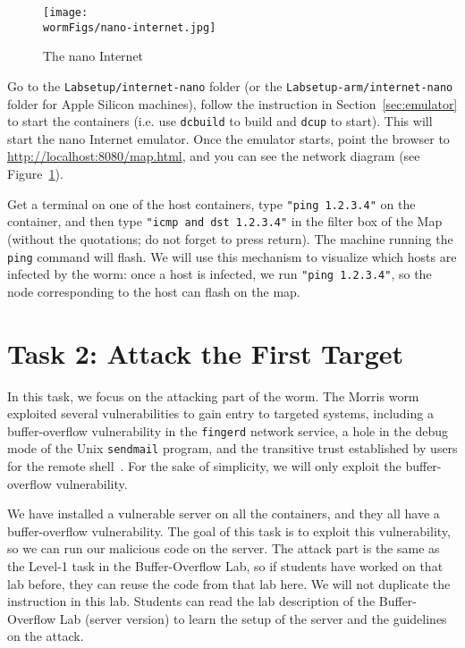 \begin{figure}[htb]
  \begin{center}
    \texttt{[image: \\wormFigs/nano-internet.jpg]}
  \end{center}
  \caption{The nano Internet}
  \label{fig:nano-internet}
\end{figure}
 

Go to the \texttt{Labsetup/internet-nano} folder (or 
the \texttt{Labsetup-arm/internet-nano} folder for Apple Silicon machines), 
follow the instruction in Section~\ref{sec:emulator} to 
start the containers (i.e. use \texttt{dcbuild} to build and 
\texttt{dcup} to start). This will start the nano Internet
emulator. Once the emulator starts,
point the browser to \url{http://localhost:8080/map.html}, and 
you can see the network diagram (see Figure~\ref{fig:nano-internet}). 

Get a terminal on one of the host containers, 
type \texttt{"ping 1.2.3.4"} on the container, 
and then type \texttt{"icmp and dst 1.2.3.4"} in the 
filter box of the Map (without the quotations; 
do not forget to press return). 
The machine running the \texttt{ping} command will flash.  
We will use this mechanism to visualize which hosts
are infected by the worm: once a host is infected, we run
\texttt{"ping 1.2.3.4"}, so the node corresponding to the 
host can flash on the map. 



\section{Task 2: Attack the First Target} 


In this task, we focus on the attacking part of the worm. 
The Morris worm exploited several vulnerabilities to gain entry to targeted systems, 
including a buffer-overflow vulnerability in the \texttt{fingerd} 
network service, a hole in the debug mode of the 
Unix \texttt{sendmail} program, and the transitive trust established 
by users for the remote shell~\cite{wiki:worm,spafford:worm}.
For the sake of simplicity, we will only exploit the 
buffer-overflow vulnerability. 

We have installed a vulnerable server on all the containers, and they
all have a buffer-overflow vulnerability. 
The goal of this task is to exploit this vulnerability, 
so we can run our malicious code on the server. 
The attack part is the same as the Level-1 task in the 
Buffer-Overflow Lab, so if students have worked on that lab before, they can
reuse the code from that lab here. 
We will not duplicate the instruction in this lab. Students can read
the lab description of the Buffer-Overflow Lab (server version) to 
learn the setup of the server and the guidelines on the attack. 


